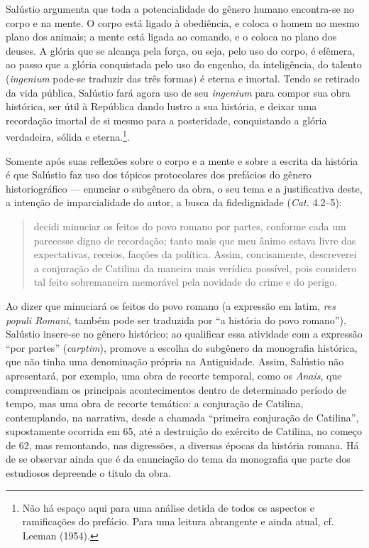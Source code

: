 Salústio argumenta que toda a potencialidade do gênero humano encontra-se no corpo e na mente. O corpo está ligado à obediência, e coloca o homem no mesmo plano dos animais; a mente está ligada ao comando, e o coloca no plano dos deuses. A glória que se alcança pela força, ou seja, pelo uso do corpo, é efêmera, ao passo que a glória conquistada pelo uso do engenho, da inteligência, do talento (\emph{ingenium} pode-se traduzir das três formas) é eterna e imortal. Tendo se retirado da vida pública, Salústio fará agora uso de seu \emph{ingenium} para compor sua obra histórica, ser útil à República dando lustro a sua história, e deixar uma recordação imortal de si mesmo para a posteridade, conquistando a glória verdadeira, sólida e eterna.\footnote{Não há espaço aqui para uma análise detida de todos os aspectos e ramificações do prefácio. Para uma leitura abrangente e ainda atual, cf. Leeman (1954).}. 
 

Somente após suas reflexões sobre o corpo  e a mente e sobre a escrita da
história é que Salústio faz uso dos tópicos protocolares dos prefácios do
gênero historiográfico --- enunciar o subgênero da obra, o seu tema e a
justificativa deste, a intenção de imparcialidade do autor, a busca da
fidedignidade (\emph{Cat.} 4.2--5):

\begin{quote}

decidi minuciar
os feitos do povo romano por partes, conforme cada um parecesse digno de
recordação; tanto mais que meu ânimo estava livre das expectativas, receios,
facções da política. Assim, concisamente, descreverei a conjuração de Catilina da maneira mais verídica possível, pois considero tal feito sobremaneira memorável
pela novidade do crime e do perigo.

\end{quote}


Ao dizer que minuciará os feitos do povo romano (a expressão em latim,
\emph{res populi Romani}, também pode ser traduzida por “a história do povo
romano”), Salústio insere-se no gênero histórico; ao qualificar essa atividade
com a expressão “por partes” (\emph{carptim}), promove a escolha do subgênero
da monografia histórica, que não tinha uma denominação própria na Antiguidade. Assim, Salústio não apresentará, por exemplo, uma obra de recorte temporal, como os \emph{Anais}, que compreendiam os principais acontecimentos dentro de determinado período de tempo, mas uma obra de recorte temático: a conjuração de Catilina, contemplando, na narrativa, desde a chamada ``primeira conjuração de Catilina'', supostamente ocorrida em 65, até a destruição do exército de Catilina, no começo de 62, mas remontando, nas digressões, a diversas épocas da história romana. Há de se observar ainda que é da enunciação do tema da monografia que parte dos estudiosos depreende o título da obra.

